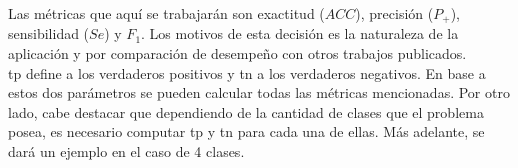 \indent Las métricas que aquí se trabajarán son exactitud ($ACC$), precisión ($P_+$), sensibilidad ($Se$) y $F_1$. Los motivos de esta decisión es la naturaleza de la aplicación y por comparación de desempeño con otros trabajos publicados. \\
\indent \acrshort{tp} define a los verdaderos positivos y \acrshort{tn} a los verdaderos negativos. En base a estos dos parámetros se pueden calcular todas las métricas mencionadas. Por otro lado, cabe destacar que dependiendo de la cantidad de clases que el problema posea, es necesario computar \acrshort{tp} y \acrshort{tn} para cada una de ellas. Más adelante, se dará un ejemplo en el caso de 4 clases. 